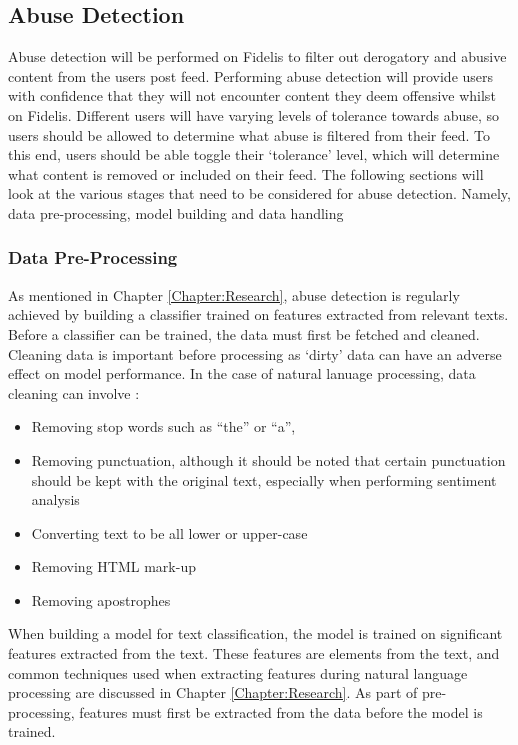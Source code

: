\subsection{Abuse Detection}
Abuse detection will be performed on Fidelis to filter out derogatory and abusive content from the users post feed. Performing abuse detection will provide users with confidence that they will not encounter content they deem offensive whilst on Fidelis. Different users will have varying levels of tolerance towards abuse, so users should be allowed to determine what abuse is filtered from their feed. To this end, users should be able toggle their `tolerance' level, which will determine what content is removed or included on their feed. The following sections will look at the various stages that need to be considered for abuse detection. Namely, data pre-processing, model building and data handling

\subsubsection{Data Pre-Processing}
As mentioned in Chapter \ref{Chapter:Research}, abuse detection is regularly achieved by building a classifier trained on features extracted from relevant texts. Before a classifier can be trained, the data must first be fetched and cleaned. Cleaning data is important before processing as `dirty' data can have an adverse effect on model performance. In the case of natural lanuage processing, data cleaning can involve \cite{han2011data}:
\begin{itemize}
\item Removing stop words such as ``the'' or ``a'', 
\item Removing punctuation, although it should be noted that certain punctuation should be kept with the original text, especially when performing sentiment analysis
\item Converting text to be all lower or upper-case
\item Removing HTML mark-up
\item Removing apostrophes
\end{itemize}

When building a model for text classification, the model is trained on significant features extracted from the text. These features are elements from the text, and common techniques used when extracting features during natural language processing are discussed in Chapter \ref{Chapter:Research}. As part of pre-processing, features must first be extracted from the data before the model is trained.

